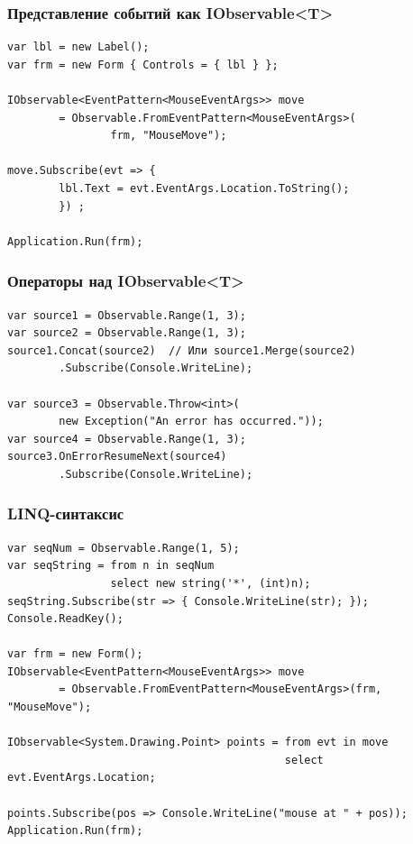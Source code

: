\documentclass[xetex,mathserif,serif]{beamer}
\begin{document}
	\begin{frame}[fragile]
		\frametitle{Представление событий как IObservable<T>}
		\begin{verbatim}
var lbl = new Label(); 
var frm = new Form { Controls = { lbl } }; 

IObservable<EventPattern<MouseEventArgs>> move 
        = Observable.FromEventPattern<MouseEventArgs>(
                frm, "MouseMove");

move.Subscribe(evt => { 
        lbl.Text = evt.EventArgs.Location.ToString(); 
        }) ;

Application.Run(frm);
		\end{verbatim}
	\end{frame}

	\begin{frame}[fragile]
		\frametitle{Операторы над IObservable<T>}
		\begin{verbatim}
var source1 = Observable.Range(1, 3);
var source2 = Observable.Range(1, 3);
source1.Concat(source2)  // Или source1.Merge(source2)
        .Subscribe(Console.WriteLine);

var source3 = Observable.Throw<int>(
        new Exception("An error has occurred."));
var source4 = Observable.Range(1, 3);
source3.OnErrorResumeNext(source4)
        .Subscribe(Console.WriteLine);
		\end{verbatim}
	\end{frame}

	\begin{frame}[fragile]
		\frametitle{LINQ-синтаксис}
		\begin{small}
			\begin{verbatim}
var seqNum = Observable.Range(1, 5);
var seqString = from n in seqNum
                select new string('*', (int)n);
seqString.Subscribe(str => { Console.WriteLine(str); });
Console.ReadKey();

var frm = new Form();
IObservable<EventPattern<MouseEventArgs>> move 
        = Observable.FromEventPattern<MouseEventArgs>(frm, "MouseMove");

IObservable<System.Drawing.Point> points = from evt in move
                                           select evt.EventArgs.Location;

points.Subscribe(pos => Console.WriteLine("mouse at " + pos));
Application.Run(frm);
			\end{verbatim}
		\end{small}
	\end{frame}
\end{document}
